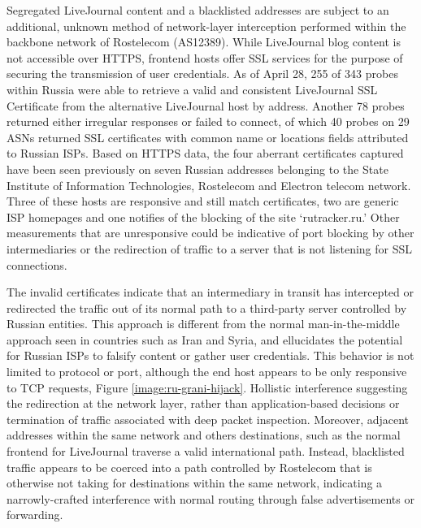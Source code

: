 Segregated LiveJournal content and a blacklisted addresses are subject to an
additional, unknown method of network-layer interception performed within the
backbone network of Rostelecom (AS12389). While LiveJournal blog content is not
accessible over HTTPS, frontend hosts offer SSL services for the purpose of
securing the transmission of user credentials. As of April 28, 255 of 343
probes within Russia were able to retrieve a valid and consistent LiveJournal
SSL Certificate from the alternative LiveJournal host by address. Another 78
probes returned either irregular responses or failed to connect, of which 40
probes on 29 ASNs returned SSL certificates with common name or locations
fields attributed to Russian ISPs. Based on HTTPS data, the four aberrant
certificates captured have been seen previously on seven Russian addresses
belonging to the State Institute of Information Technologies, Rostelecom and
Electron telecom network. Three of these hosts are responsive and still match
certificates, two are generic ISP homepages and one notifies of the blocking of
the site `rutracker.ru.' Other measurements that are unresponsive could be
indicative of port blocking by other intermediaries or the redirection of
traffic to a server that is not listening for SSL connections.

The invalid certificates indicate that an intermediary in transit has
intercepted or redirected the traffic out of its normal path to a third-party
server controlled by Russian entities. This approach is different from the
normal man-in-the-middle approach seen in countries such as Iran and Syria, and
ellucidates the potential for Russian ISPs to falsify content or gather user
credentials. This behavior is not limited to protocol or port, although the end
host appears to be only responsive to TCP requests, Figure
\ref{image:ru-grani-hijack}. Hollistic interference suggesting the redirection
at the network layer, rather than application-based decisions or termination of
traffic associated with deep packet inspection. Moreover, adjacent addresses
within the same network and others destinations, such as the normal frontend
for LiveJournal traverse a valid international path. Instead, blacklisted
	traffic appears to be coerced into a path controlled by Rostelecom that is
	otherwise not taking for destinations within the same network, indicating a
	narrowly-crafted interference with normal routing through false
	advertisements or forwarding.
